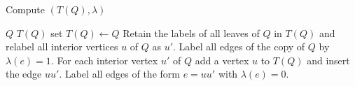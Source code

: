\documentclass[smallextended]{svjour3}
\newcommand{\rev}[1]{\begingroup\color{blue}#1\endgroup}
\newcommand{\remove}[1]{\begingroup\tiny\color{yellow}#1\endgroup}
\newcommand{\Ro}{\mathrel{\overset{0}{\sim}}}
\newcommand{\Rl}{\mathrel{\overset{1}{\sim}}}
\begin{document}




\begin{algorithm}
\caption{Compute $(T(Q), \lambda)$}
\label{alg:Q}
\begin{algorithmic}[1]
  \REQUIRE $Q$
  \ENSURE $T(Q)$
  \STATE set $T(Q)\leftarrow Q$ 
  \STATE Retain the labels of all leaves of $Q$ in $T(Q)$ and relabel 
			all interior vertices $u$ of $Q$ as $u'$.
  \STATE Label all edges of the copy of $Q$ by $\lambda(e)=1$.
  \STATE For each interior vertex $u'$ of $Q$ add a vertex $u$ to $T(Q)$ and 
		   insert the edge $uu'$. 
  \STATE Label all edges of the form $e=uu'$ with $\lambda(e)=0$. 
\end{algorithmic}
\end{algorithm}
\end{document}
